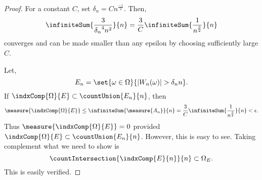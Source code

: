 \begin{proof}
    For a constant $C$, set $\delta_n = Cn^{\frac{-1}{2}}$. Then,
    \[\infiniteSum{\frac{3}{{\delta_n}^4n^2}}{n} =
	\frac{3}{C}\infiniteSum{\frac{1}{n^{\frac{3}{2}}}}{n}\] 
     converges and can be made smaller than any epsilon by choosing sufficiently large $C$.

     Let,\[E_n = \set{\omega\in\Omega}{\lvert W_n(\omega)\rvert > \delta_{n}n}.\]
     If $\indxComp{\Omega}{E} \subset \countUnion{E_n}{n}$, then
     \[\measure{\indxComp{\Omega}{E}} \leq \infiniteSum{\measure{A_n}}{n} =
	 \frac{3}{C}\infiniteSum{\frac{1}{n^{\frac{3}{2}}}}{n} < \epsilon.  \]
     Thus $\measure{\indxComp{\Omega}{E}} = 0$ provided 
     $\indxComp{\Omega}{E} \subset \countUnion{E_n}{n}$. However, this is easy to see. Taking
     complement what we need to show is 
     \[\countIntersection{\indxComp{E}{n}}{n} \subset \Omega_{E}.\] This is easily verified.
\end{proof}

